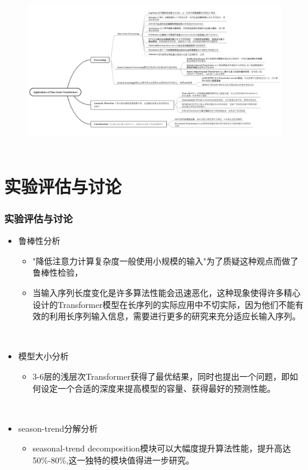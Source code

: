 \documentclass[10pt,t,handout]{beamer}
\begin{document}
 \begin{frame}
 	
 	\
 	
 	\
 	
 	{ }
 	
 	\
 		\begin{figure}
 		\centering
 		\includegraphics[scale=0.41]{应用.png}	~~~~
 		
 	\end{figure}
 	
 \end{frame}
\section{实验评估与讨论}
\begin{frame}
\frametitle{实验评估与讨论}

\begin{itemize}
	\item<1->  鲁棒性分析
	\begin{itemize}
		\item<1-> "降低注意力计算复杂度一般使用小规模的输入"为了质疑这种观点而做了鲁棒性检验， 
		\item<1->  当输入序列长度变化是许多算法性能会迅速恶化，这种现象使得许多精心设计的Transformer模型在长序列的实际应用中不切实际，因为他们不能有效的利用长序列输入信息，需要进行更多的研究来充分适应长输入序列。	
	\end{itemize}

 	\
	\item<2->模型大小分析
	
	\begin{itemize}
		\item<2-> 3-6层的浅层次Transformer获得了最优结果，同时也提出一个问题，即如何设定一个合适的深度来提高模型的容量、获得最好的预测性能。 
	\end{itemize}

\
	\item<3->season-trend分解分析
	\begin{itemize}
		\item<3-> seasonal-trend decomposition模块可以大幅度提升算法性能，提升高达50\%-80\%,这一独特的模块值得进一步研究。
 
		
	\end{itemize}
\end{itemize}
\end{frame}
\end{document}
